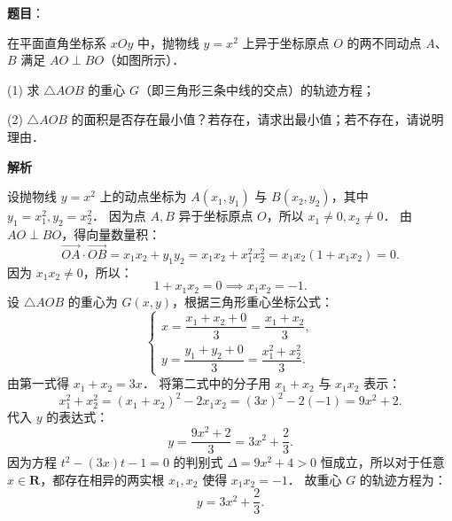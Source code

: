 \begin{answer}

\textbf{题目}：

在平面直角坐标系 $xOy$ 中，抛物线 $y = x^2$ 上异于坐标原点 $O$ 的两不同动点 $A$、$B$ 满足 $AO \perp BO$（如图所示）．
\nopagebreak[4]
\begin{center}\end{center}
\nopagebreak[4]
(1) 求 $\triangle AOB$ 的重心 $G$（即三角形三条中线的交点）的轨迹方程；

(2) $\triangle AOB$ 的面积是否存在最小值？若存在，请求出最小值；若不存在，请说明理由．

\textbf{解析}


设抛物线 $y = x^2$ 上的动点坐标为 $A(x_1, y_1)$ 与 $B(x_2, y_2)$，其中 $y_1 = x_1^2, y_2 = x_2^2$．
因为点 $A, B$ 异于坐标原点 $O$，所以 $x_1 \neq 0, x_2 \neq 0$．
由 $AO \perp BO$，得向量数量积：
\nopagebreak[4]
\[
\vec{OA} \cdot \vec{OB} = x_1 x_2 + y_1 y_2 = x_1 x_2 + x_1^2 x_2^2 = x_1 x_2(1 + x_1 x_2) = 0.
\]
因为 $x_1 x_2 \neq 0$，所以：
\nopagebreak[4]
\[
1 + x_1 x_2 = 0 \implies x_1 x_2 = -1.
\]
设 $\triangle AOB$ 的重心为 $G(x, y)$，根据三角形重心坐标公式：
\nopagebreak[4]
\[
\begin{cases}
x = \dfrac{x_1 + x_2 + 0}{3} = \dfrac{x_1 + x_2}{3}, \\
y = \dfrac{y_1 + y_2 + 0}{3} = \dfrac{x_1^2 + x_2^2}{3}.
\end{cases}
\]
由第一式得 $x_1 + x_2 = 3x$．
将第二式中的分子用 $x_1 + x_2$ 与 $x_1 x_2$ 表示：
\nopagebreak[4]
\[
x_1^2 + x_2^2 = (x_1 + x_2)^2 - 2x_1 x_2 = (3x)^2 - 2(-1) = 9x^2 + 2.
\]
代入 $y$ 的表达式：
\nopagebreak[4]
\[
y = \frac{9x^2 + 2}{3} = 3x^2 + \frac{2}{3}.
\]
因为方程 $t^2 - (3x)t - 1 = 0$ 的判别式 $\Delta = 9x^2 + 4 > 0$ 恒成立，所以对于任意 $x \in \mathbf{R}$，都存在相异的两实根 $x_1, x_2$ 使得 $x_1 x_2 = -1$．
故重心 $G$ 的轨迹方程为：
\nopagebreak[4]
\[
y = 3x^2 + \frac{2}{3}.
\]



\end{answer}
